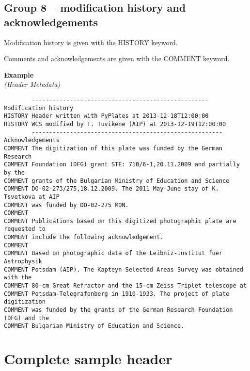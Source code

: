 \documentclass[11pt]{ivoa}
\newenvironment{fitsexample}[1]
{\bigskip\noindent\textbf{Example}\\\textit{(#1\smallskip)}}
{\medskip}
\begin{document}
\subsection{Group 8 – modification history and acknowledgements}

Modification history is given with the HISTORY keyword.

Comments and acknowledgements are given with the COMMENT keyword.


\begin{fitsexample}{Header Metadata}
\begin{lstlisting}
        --------------------------------------------------- Modification history
HISTORY Header written with PyPlates at 2013-12-18T12:00:00
HISTORY WCS modified by T. Tuvikene (AIP) at 2013-12-19T12:00:00
        ------------------------------------------------------- Acknowledgements
COMMENT The digitization of this plate was funded by the German Research
COMMENT Foundation (DFG) grant STE: 710/6-1,20.11.2009 and partially by the
COMMENT grants of the Bulgarian Ministry of Education and Science
COMMENT DO-02-273/275,18.12.2009. The 2011 May-June stay of K. Tsvetkova at AIP
COMMENT was funded by DO-02-275 MON.
COMMENT
COMMENT Publications based on this digitized photographic plate are requested to
COMMENT include the following acknowledgement.
COMMENT
COMMENT Based on photographic data of the Leibniz-Institut fuer Astrophysik
COMMENT Potsdam (AIP). The Kapteyn Selected Areas Survey was obtained with the
COMMENT 80-cm Great Refractor and the 15-cm Zeiss Triplet telescope at
COMMENT Potsdam-Telegrafenberg in 1910-1933. The project of plate digitization
COMMENT was funded by the grants of the German Research Foundation (DFG) and the
COMMENT Bulgarian Ministry of Education and Science.
\end{lstlisting}
\end{fitsexample}


\section{Complete sample header}
\label{sect:samplehdr}
\end{document}
